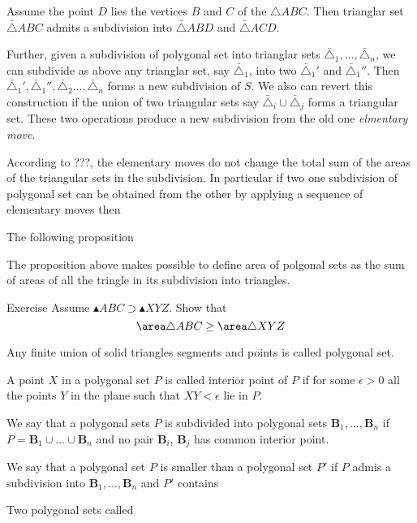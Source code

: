 {Assume the point $D$ lies the vertices $B$ and $C$ of the $\triangle ABC$.
Then trianglar set $\bar\triangle ABC$ admits a subdivision into  $\bar\triangle ABD$ and $\bar\triangle ACD$.

Further, given a subdivision of polygonal set into trianglar sets $\bar\triangle_1,\dots,\bar\triangle_n$,
we can subdivide as above 
any trianglar set, say $\bar\triangle_1$,
into two $\bar\triangle_1'$ and $\bar\triangle_1''$.
Then 
$\bar\triangle_1',\bar\triangle_1'',\bar\triangle_2\dots,\bar\triangle_n$
forms a new subdivision of $S$.
We also can revert this construction if the union of two triangular sets 
say $\bar\triangle_i\cup \bar\triangle_j$ forms a triangular set.
These two operations produce a new subdivision from the old one \emph{elmentary move}.

According to ???,
the elementary moves do not change the total sum of the areas of the triangular sets in the subdivision.
In particular if two one subdivision of polygonal set can be obtained from the other by applying a sequence of elementary moves then 

The following proposition 



The proposition above makes possible to define area of polgonal sets
as the sum of areas of all the tringle in its subdivision into triangles.


\begin{thm}{Exercise}
Assume $\blacktriangle ABC\supset \blacktriangle XYZ$.
Show that 
\[\area \triangle ABC\ge \area \triangle XYZ\]

\end{thm}


Any finite union of solid triangles segments and points is called polygonal set.

A point $X$ in a polygonal set $P$ is called interior point of $P$ 
if for some $\epsilon>0$ all the points $Y$ in the plane such that $XY<\epsilon$ lie in $P$.

We say that a polygonal sets $P$ 
is subdivided into polygonal sets $\bm{B}_1,\dots, \bm{B}_n$
if $P=\bm{B}_1\cup\dots\cup \bm{B}_n$
and no pair $\bm{B}_i$, $\bm{B}_j$ has common interior point.

We say that a polygonal set $P$ 
is smaller than a polygonal set $P'$
if $P$ admis a subdivision into $\bm{B}_1,\dots, \bm{B}_n$
and $P'$ contains 

Two polygonal sets called 













}
